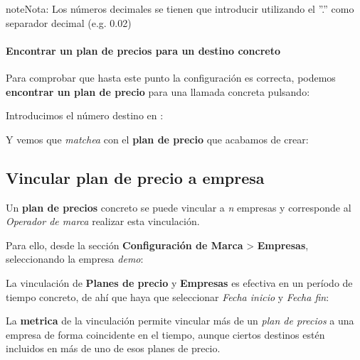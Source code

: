 \documentclass[letterpaper,10pt,spanish]{sphinxmanual}
\begin{document}
\begin{notice}{note}{Nota:}
Los números decimales se tienen que introducir utilizando el ''.'' como separador decimal (e.g. 0.02)
\end{notice}
\paragraph{Encontrar un plan de precios para un destino concreto}

Para comprobar que hasta este punto la configuración es correcta, podemos \textbf{encontrar un plan de precio} para una llamada concreta pulsando:

\noindent{}

Introducimos el número destino en {\hyperref[external_incoming_calls/numeric_transformations:e164]{}}:

\noindent{}

Y vemos que \emph{matchea} con el \textbf{plan de precio} que acabamos de crear:

\noindent{}


\subsection{Vincular plan de precio a empresa}
\label{external_outgoing_calls/noplan_nocall:pricing-plan-to-company}\label{external_outgoing_calls/noplan_nocall:vincular-plan-de-precio-a-empresa}
Un \textbf{plan de precios} concreto se puede vincular a \emph{n} empresas y corresponde al \emph{Operador de marca} realizar esta vinculación.

Para ello, desde la sección \textbf{Configuración de Marca} \textgreater{} \textbf{Empresas}, seleccionando la empresa \emph{demo}:

\noindent{}

La vinculación de \textbf{Planes de precio} y \textbf{Empresas} es efectiva en un período de tiempo concreto, de ahí que haya que seleccionar \emph{Fecha inicio} y \emph{Fecha fin}:

\noindent{}

La \textbf{metrica} de la vinculación permite vincular más de un \emph{plan de precios} a una empresa de forma coincidente en el tiempo, aunque ciertos destinos estén incluidos en más de uno de esos planes de precio.
\end{document}
